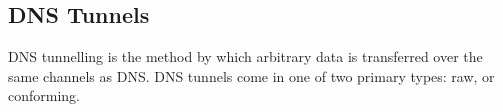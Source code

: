 \documentclass{llncs}
\begin{document}
%

\subsection{DNS Tunnels}
\label{tunnels-types}
DNS tunnelling is the method by which arbitrary data is transferred
over the same channels as DNS. DNS tunnels come in one of two primary types: raw, or
conforming.
\end{document}
